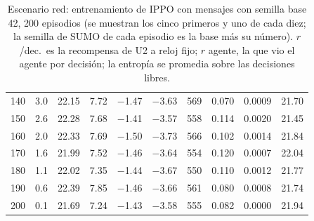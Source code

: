\begin{table}[H]
\begin{tabular}{rrrrrrrrrr}
140 & 3.0 & 22.15 & 7.72 & $-$1.47 & $-$3.63 & 569 & 0.070 & 0.0009 & 21.70 \\
150 & 2.6 & 22.28 & 7.68 & $-$1.41 & $-$3.57 & 558 & 0.114 & 0.0020 & 21.45 \\
160 & 2.0 & 22.33 & 7.69 & $-$1.50 & $-$3.73 & 566 & 0.102 & 0.0014 & 21.84 \\
170 & 1.6 & 21.99 & 7.52 & $-$1.46 & $-$3.64 & 554 & 0.120 & 0.0007 & 22.04 \\
180 & 1.1 & 22.02 & 7.35 & $-$1.44 & $-$3.67 & 550 & 0.110 & 0.0012 & 21.77 \\
190 & 0.6 & 22.39 & 7.85 & $-$1.46 & $-$3.66 & 561 & 0.080 & 0.0008 & 21.74 \\
200 & 0.1 & 21.69 & 7.24 & $-$1.43 & $-$3.58 & 555 & 0.082 & 0.0000 & 21.94 \\
\bottomrule
\end{tabular}
\caption[Escenario red: entrenamiento de IPPO con mensajes, semilla base 42]{Escenario red: entrenamiento de IPPO con mensajes con semilla base 42, 200 episodios (se muestran los cinco primeros y uno de cada diez; la semilla de SUMO de cada episodio es la base más su número). $r$/dec.\ es la recompensa de U2 a reloj fijo; $r$ agente, la que vio el agente por decisión; la entropía se promedia sobre las decisiones libres.}
\label{tab:red-ippo-vecinos-42}
\end{table}

